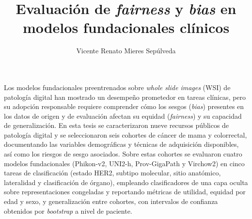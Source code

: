 \documentclass[dosguias,openany]{tesisusach}
\title{Evaluación de \textit{fairness} y \textit{bias} en modelos fundacionales clínicos}
\author{Vicente Renato Mieres Sepúlveda}
\date{\the\year}
\begin{document}
	\maketitle
	\frontmatter
	
	\begin{resumenEs}
		Los modelos fundacionales preentrenados sobre \textit{whole slide images} (WSI) de patología digital han mostrado un desempeño prometedor en tareas clínicas, pero su adopción responsable requiere comprender cómo los sesgos (\textit{bias}) presentes en los datos de origen y de evaluación afectan su equidad (\textit{fairness}) y su capacidad de generalización. En esta tesis se caracterizaron nueve recursos públicos de patología digital y se seleccionaron seis cohortes de cáncer de mama y colorrectal, documentando las variables demográficas y técnicas de adquisición disponibles, así como los riesgos de sesgo asociados. Sobre estas cohortes se evaluaron cuatro modelos fundacionales (Phikon-v2, UNI2-h, Prov-GigaPath y Virchow2) en cinco tareas de clasificación (estado HER2, subtipo molecular, sitio anatómico, lateralidad y clasificación de órgano), empleando clasificadores de una capa oculta sobre representaciones congeladas y reportando métricas de utilidad, equidad por edad y sexo, y generalización entre cohortes, con intervalos de confianza obtenidos por \textit{bootstrap} a nivel de paciente.
	\end{resumenEs}
	
\end{document}
